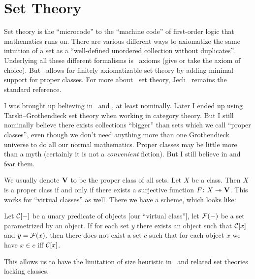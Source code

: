 \chapter{Set Theory}

\begin{node}\label{set-0000}%
Set theory is the ``microcode'' to the ``machine code'' of first-order
logic that mathematics runs on. There are various different ways to
axiomatize the same intuition of a set as a ``well-defined unordered
collection without duplicates''. Underlying all these different
formalisms is \ZFC\ axioms (give or take the axiom of choice). But
\NBG\ allows for finitely axiomatizable set theory by adding minimal
support for proper classes. For more about \ZFC\ set theory,
Jech~\cite{jech2003set} remains the standard reference.
\end{node}

\begin{node}[Classes]\label{set-0003}%
I was brought up believing in \ZFC\ and \NBG, at least nominally. Later
I ended up using Tarski--Grothendieck set theory when working in
category theory. But I still nominally believe there exists collections
``bigger'' than sets which we call ``proper classes'', even though we
don't need anything more than one Grothendieck universe to do all our
normal mathematics. Proper classes may be little more than a myth
(certainly it is not a \emph{convenient} fiction). But I still believe in
and fear them.
\end{node}

\begin{node}\label{set-0004}%
We usually denote $\mathbf{V}$ to be the proper class of all
sets. Let $X$ be a class. Then $X$ is a proper class if and only if
there exists a surjective function $F\colon X\twoheadrightarrow\mathbf{V}$.
This works for ``virtual classes'' as well. There we have a scheme,
which looks like:

Let $\mathcal{C}[-]$ be a unary predicate of objects [our ``virtual
class''], let $\mathcal{F}(-)$ be a set parametrized by an
object. If for each set $y$ there exists an object such that
$\mathcal{C}[x]$ and $y=\mathcal{F}(x)$, then there does not
exist a set $c$ such that for each object $x$ we have $x\in c$ iff
$\mathcal{C}[x]$.

This allows us to have the limitation of size heuristic in \ZFC\ and
related set theories lacking classes.
\end{node}




